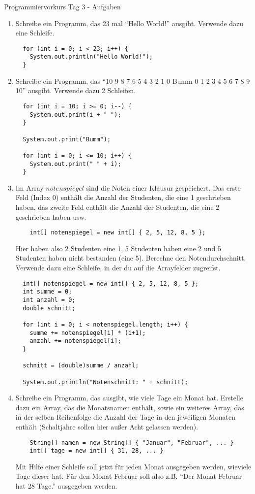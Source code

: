 \documentclass[final,a4paper]{article}
\begin{document}
\lstset{tabsize=4}
\lstset{basicstyle=\small}
\lstset{language=java}

{\huge Programmiervorkurs Tag 3 - Aufgaben}

\bigskip

\begin{enumerate}
  \item{
	Schreibe ein Programm, das 23 mal "`Hello World!"' ausgibt. Verwende dazu eine Schleife.

	\begin{lstlisting}
  for (int i = 0; i < 23; i++) {
	System.out.println("Hello World!");
  }
	\end{lstlisting}
	}
  \item{
	Schreibe ein Programm, das "`10 9 8 7 6 5 4 3 2 1 0 Bumm 0 1 2 3 4 5 6 7 8 9 10"' ausgibt.
	Verwende dazu 2 Schleifen.

	\begin{lstlisting}
  for (int i = 10; i >= 0; i--) {
	System.out.print(i + " ");
  }

  System.out.print("Bumm");

  for (int i = 0; i <= 10; i++) {
	System.out.print(" " + i);
  }
	\end{lstlisting}
	}
  \item{
	Im Array $notenspiegel$ sind die Noten einer Klausur gespeichert. Das erste Feld (Index $0$)
	enthält die Anzahl der Studenten, die eine 1 geschrieben haben, das zweite Feld enthält
	die Anzahl der Studenten, die eine 2 geschrieben haben usw.
	\begin{lstlisting}
	int[] notenspiegel = new int[] { 2, 5, 12, 8, 5 };
	\end{lstlisting}
	Hier haben also 2 Studenten eine 1, 5 Studenten haben eine 2 und 5 Studenten haben nicht bestanden (eine 5).
	Berechne den Notendurchschnitt. Verwende dazu eine Schleife, in der du auf die
	Arrayfelder zugreifst.

	\begin{lstlisting}
  int[] notenspiegel = new int[] { 2, 5, 12, 8, 5 };
  int summe = 0;
  int anzahl = 0;
  double schnitt;

  for (int i = 0; i < notenspiegel.length; i++) {
	summe += notenspiegel[i] * (i+1);
	anzahl += notenspiegel[i];
  }

  schnitt = (double)summe / anzahl;

  System.out.println("Notenschnitt: " + schnitt);
	\end{lstlisting}
	}
  \item{
	Schreibe ein Programm, das ausgibt, wie viele Tage ein Monat hat. Erstelle dazu ein Array,
	das die Monatsnamen enthält, sowie ein weiteres Array, das in der selben Reihenfolge die Anzahl
	der Tage in den jeweiligen Monaten enthält (Schaltjahre sollen hier außer Acht gelassen werden).
	\begin{lstlisting}
	String[] namen = new String[] { "Januar", "Februar", ... }
	int[] tage = new int[] { 31, 28, ... }
	\end{lstlisting}
	Mit Hilfe einer Schleife soll jetzt für jeden Monat ausgegeben werden, wieviele Tage dieser hat.
	Für den Monat Februar soll also z.B. "`Der Monat Februar hat 28 Tage."' ausgegeben werden.

}
\end{enumerate}
\end{document}
